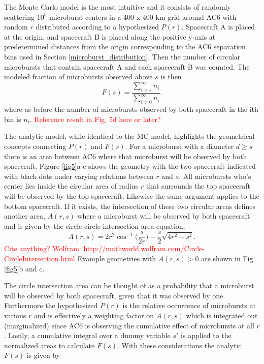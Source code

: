 \documentclass[draft]{agujournal2019}
\begin{document}
The Monte Carlo model is the most intuitive and it consists of randomly scattering $10^5$ microburst centers in a 400 x 400 km grid around AC6 with random $r$ distributed according to a hypothesized $P(r)$. Spacecraft A is placed at the origin, and spacecraft B is placed along the positive y-axis at predetermined distances from the origin corresponding to the AC6 separation bins used in Section \ref{microburst_distribution}. Then the number of circular microbursts that contain spacecraft A and each spacecraft B was counted. The modeled fraction of microbursts observed above $s$ is then
\begin{equation}
F(s) = \frac{\displaystyle\sum_{i > s}^\infty n_{i} }{ \displaystyle\sum_{i > 0}^\infty n_{i} }.
\end{equation} where as before the number of microbursts observed by both spacecraft in the ith bin is $n_{i}$. \textcolor{red}{Reference result in Fig. 5d here or later?}

The analytic model, while identical to the MC model, highlights the geometrical concepts connecting $P(r)$ and $F(s)$. For a microburst with a diameter $d \geq s$ there is an area between AC6 where that microburst will be observed by both spacecraft. Figure \ref{fig5}a-c shows the geometry with the two spacecraft indicated with black dots under varying relations between $r$ and $s$. All microbursts who's center lies inside the circular area of radius $r$ that surrounds the top spacecraft will be observed by the top spacecraft. Likewise the same argument applies to the bottom spacecraft. If it exists, the intersection of these two circular areas defines another area, $A(r, s)$ where a microburst will be observed by both spacecraft and is given by the circle-circle intersection area equation, 
\begin{equation}
A(r, s) = 2r^2 \cos^{-1}{\Big( \frac{s}{2r} \Big)} - \frac{s}{2} \sqrt{4r^2 - s^2}.
\end{equation} \textcolor{red}{Cite anything? Wolfram: http://mathworld.wolfram.com/Circle-CircleIntersection.html} Example geometries with $A(r, s) > 0$ are shown in Fig. \ref{fig5}b and c.

The circle intersection area can be thought of as a probability that a microburst will be observed by both spacecraft, given that it was observed by one. Furthermore the hypothesized $P(r)$ is the relative occurrence of microbursts at various $r$ and is effectively a weighting factor on $A(r, s)$ which is integrated out (marginalized) since AC6 is observing the cumulative effect of microbursts at all $r$. Lastly, a cumulative integral over a dummy variable $s'$ is applied to the normalized areas to calculate $F(s)$. With these considerations the analytic $F(s)$ is given by
\end{document}
